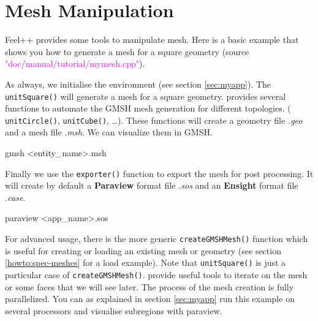 %


\section{Mesh Manipulation}
\label{sec:mymesh}

Feel++ provides some tools to manipulate mesh. 
Here is a basic example that shows
you how to generate a mesh for a square geometry
(source \textcolor{magenta}{"doc/manual/tutorial/mymesh.cpp"}).
%
\vspace{2mm}

\vspace{2mm}

As always, we initialise the \feel environment (see section \ref{sec:myapp}).
The \lstinline!unitSquare()! will generate a mesh for a square geometry.
\feel provides several functions to automate the GMSH mesh generation
for different topologies.
%
( \lstinline!unitCircle()!,
  \lstinline!unitCube()!,
  \dots ).
%
These functions will create a geometry file
\textit{.geo} and a mesh file \textit{.msh}. We can visualize them in GMSH. 
%
\begin{unixcom}
    gmsh <entity_name>.msh
\end{unixcom}
%
Finally we use the \lstinline!exporter()! function to export the mesh for post processing.
It will create by default a \textbf{Paraview} format file \textit{.sos} and an \textbf{Ensight}
format file \textit{.case}.
%
\begin{unixcom}
    paraview <app_name>.sos
\end{unixcom}
%
For advanced usage, there is the more generic \lstinline!createGMSHMesh()! function which is
useful for creating or loading an existing mesh or geometry (see section \ref{howto:spec-meshes}
for a load example).
Note that \lstinline!unitSquare()! is just a particular case of \lstinline!createGMSHMesh()!.
\feel provide useful tools to iterate on the mesh or some faces that we will see later.
%
The process of the mesh creation is fully parallelized. You can as explained in section \ref{sec:myapp}
run this example on several processors and visualise subregions with paraview.


